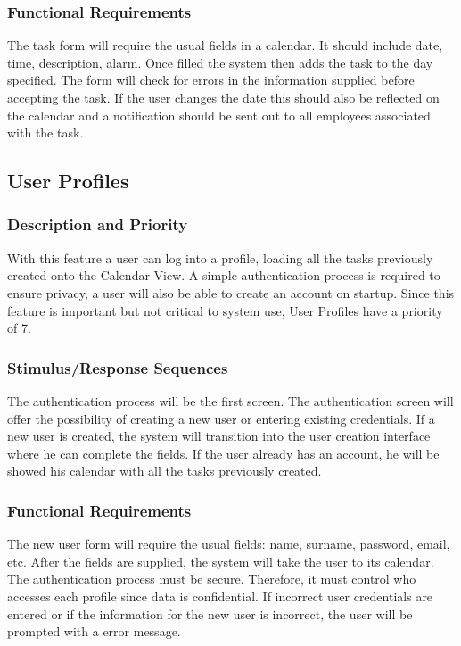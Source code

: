 \documentclass{article}
\begin{document}
\subsubsection{Functional Requirements}
The task form will require the usual fields in a calendar. 
It should include date, time, description, alarm. 
Once filled the system then adds the task to the day specified. 
The form will check for errors in the information supplied before accepting the task. 
If the user changes the date this should also be reflected on the calendar and a notification should be sent out to all employees associated with the task.

\subsection{User Profiles}
\subsubsection{Description and Priority}
With this feature a user can log into a profile, loading all the tasks previously created onto the Calendar View. 
A simple authentication process is required to ensure privacy, a user will also be able to create an account on startup. 
Since this feature is important but not critical to system use, User Profiles have a priority of 7.

\subsubsection{Stimulus/Response Sequences}
The authentication process will be the first screen. 
The authentication screen will offer the possibility of creating a new user or entering existing credentials. 
If a new user is created, the system will transition into the user creation interface where he can complete the fields. 
If the user already has an account, he will be showed his calendar with all the tasks previously created. 
\subsubsection{Functional Requirements}
The new user form will require the usual fields: name, surname, password, email, etc. 
After the fields are supplied, the system will take the user to its calendar. 
The authentication process must be secure. Therefore, it must control who accesses each profile since data is confidential. 
If incorrect user credentials are entered or if the information for the new user is incorrect, the user will be prompted with a error message.
\end{document}
